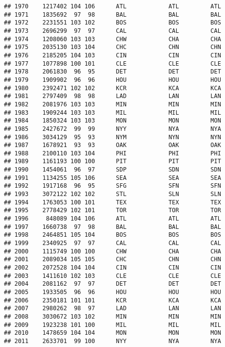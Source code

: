 \documentclass[]{article}
\begin{document}
\begin{verbatim}
## 1970    1217402 104 106      ATL            ATL         ATL
## 1971    1835692  97  98      BAL            BAL         BAL
## 1972    2231551 103 102      BOS            BOS         BOS
## 1973    2696299  97  97      CAL            CAL         CAL
## 1974    1208060 103 103      CHW            CHA         CHA
## 1975    2035130 103 104      CHC            CHN         CHN
## 1976    2185205 104 103      CIN            CIN         CIN
## 1977    1077898 100 101      CLE            CLE         CLE
## 1978    2061830  96  95      DET            DET         DET
## 1979    1909902  96  96      HOU            HOU         HOU
## 1980    2392471 102 102      KCR            KCA         KCA
## 1981    2797409  98  98      LAD            LAN         LAN
## 1982    2081976 103 103      MIN            MIN         MIN
## 1983    1909244 103 103      MIL            MIL         MIL
## 1984    1850324 103 103      MON            MON         MON
## 1985    2427672  99  99      NYY            NYA         NYA
## 1986    3034129  95  93      NYM            NYN         NYN
## 1987    1678921  93  93      OAK            OAK         OAK
## 1988    2100110 103 104      PHI            PHI         PHI
## 1989    1161193 100 100      PIT            PIT         PIT
## 1990    1454061  96  97      SDP            SDN         SDN
## 1991    1134255 105 106      SEA            SEA         SEA
## 1992    1917168  96  95      SFG            SFN         SFN
## 1993    3072122 102 102      STL            SLN         SLN
## 1994    1763053 100 101      TEX            TEX         TEX
## 1995    2778429 102 101      TOR            TOR         TOR
## 1996     848089 104 106      ATL            ATL         ATL
## 1997    1660738  97  98      BAL            BAL         BAL
## 1998    2464851 105 104      BOS            BOS         BOS
## 1999    2340925  97  97      CAL            CAL         CAL
## 2000    1115749 100 100      CHW            CHA         CHA
## 2001    2089034 105 105      CHC            CHN         CHN
## 2002    2072528 104 104      CIN            CIN         CIN
## 2003    1411610 102 103      CLE            CLE         CLE
## 2004    2081162  97  97      DET            DET         DET
## 2005    1933505  96  96      HOU            HOU         HOU
## 2006    2350181 101 101      KCR            KCA         KCA
## 2007    2980262  98  97      LAD            LAN         LAN
## 2008    3030672 103 102      MIN            MIN         MIN
## 2009    1923238 101 100      MIL            MIL         MIL
## 2010    1478659 104 104      MON            MON         MON
## 2011    2633701  99 100      NYY            NYA         NYA

\end{verbatim}
\end{document}
